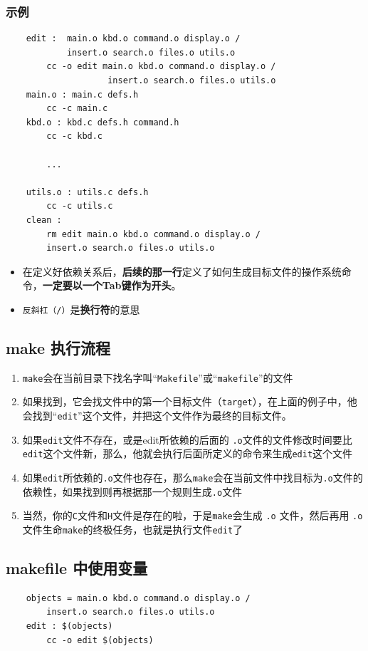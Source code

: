 \documentclass[UTF8,a4paper,12pt]{ctexbook} %
\begin{document}
			\subsubsection{示例}
				\begin{lstlisting}
	edit :  main.o kbd.o command.o display.o /
			insert.o search.o files.o utils.o
		cc -o edit main.o kbd.o command.o display.o /
					insert.o search.o files.o utils.o
	main.o : main.c defs.h
		cc -c main.c
	kbd.o : kbd.c defs.h command.h
		cc -c kbd.c
		
		...
		
	utils.o : utils.c defs.h
		cc -c utils.c
	clean :
		rm edit main.o kbd.o command.o display.o /
		insert.o search.o files.o utils.o
				\end{lstlisting}
				\begin{itemize}
					\item 在定义好依赖关系后，\textbf{后续的那一行}定义了如何生成目标文件的操作系统命令，\textbf{一定要以一个Tab键作为开头}。
					\item \verb|反斜杠（/）|是\textbf{换行符}的意思
				\end{itemize}
		
		\subsection{make 执行流程}
			\begin{enumerate}
				\item \verb|make|会在当前目录下找名字叫“\verb|Makefile|”或“\verb|makefile|”的文件
				\item 如果找到，它会找文件中的第一个目标文件（\verb|target|），在上面的例子中，他会找到“\verb|edit|”这个文件，并把这个文件作为最终的目标文件。
				\item 如果\verb|edit|文件不存在，或是edit所依赖的后面的 \verb|.o|文件的文件修改时间要比\verb|edit|这个文件新，那么，他就会执行后面所定义的命令来生成\verb|edit|这个文件
				\item 如果\verb|edit|所依赖的\verb|.o|文件也存在，那么\verb|make|会在当前文件中找目标为\verb|.o|文件的依赖性，如果找到则再根据那一个规则生成\verb|.o|文件
				\item 当然，你的\verb|C|文件和\verb|H|文件是存在的啦，于是\verb|make|会生成 \verb|.o| 文件，然后再用 \verb|.o |文件生命\verb|make|的终极任务，也就是执行文件\verb|edit|了
			\end{enumerate}
			
		\subsection{makefile 中使用变量}
			\begin{lstlisting}
	objects = main.o kbd.o command.o display.o /
		insert.o search.o files.o utils.o
	edit : $(objects)
		cc -o edit $(objects)
			\end{lstlisting}
		
\end{document}
